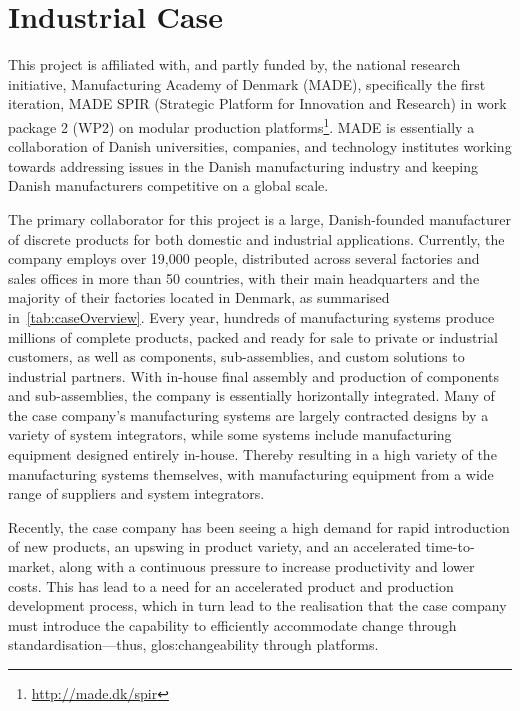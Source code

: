 \section{Industrial Case}
This \PhD{} project is affiliated with, and partly funded by, the national research initiative, Manufacturing Academy of Denmark (MADE), specifically the first iteration, MADE SPIR (Strategic Platform for Innovation and Research) in work package 2 (WP2) on modular production platforms\footnote{\url{http://made.dk/spir}}.
MADE is essentially a collaboration of Danish universities, companies, and technology institutes working towards addressing issues in the Danish manufacturing industry and keeping Danish manufacturers competitive on a global scale.

The primary collaborator for this \PhD{} project is a large, Danish-founded manufacturer of discrete products for both domestic and industrial applications.
Currently, the company employs over 19,000 people, distributed across several factories and sales offices in more than 50 countries, with their main headquarters and the majority of their factories located in Denmark, as summarised in~\cref{tab:caseOverview}.
Every year, hundreds of manufacturing systems produce millions of complete products, packed and ready for sale to private or industrial customers, as well as components, sub-assemblies, and custom solutions to industrial partners.
With in-house final assembly and production of components and sub-assemblies, the company is essentially horizontally integrated.
Many of the case company's manufacturing systems are largely contracted designs by a variety of system integrators, while some systems include manufacturing equipment designed entirely in-house.
Thereby resulting in a high variety of the manufacturing systems themselves, with manufacturing equipment from a wide range of suppliers and system integrators.

Recently, the case company has been seeing a high demand for rapid introduction of new products, an upswing in product variety, and an accelerated time-to-market, along with a continuous pressure to increase productivity and lower costs.
This has lead to a need for an accelerated product and production development process, which in turn lead to the realisation that the case company must introduce the capability to efficiently accommodate change through standardisation---thus, \gls{glos:changeability} through platforms.

